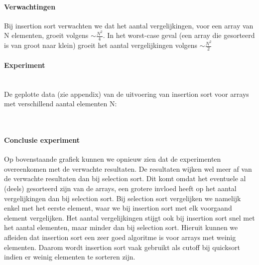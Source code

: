 \documentclass[11pt, a4paper]{article}
\begin{document}
\paragraph{Verwachtingen} Bij insertion sort verwachten we dat het aantal vergelijkingen, voor een array van N elementen, groeit volgens $\sim \frac{N^2}{4}$. In het worst-case geval (een array die gesorteerd is van groot naar klein) groeit het aantal vergelijkingen volgens $\sim \frac{N^2}{2}$ 
\paragraph{Experiment}\hspace{0pt}\\
De geplotte data (zie appendix) van de uitvoering van insertion sort voor arrays met verschillend aantal elementen N:\\
\\
\paragraph{Conclusie experiment} Op bovenstaande grafiek kunnen we opnieuw zien dat de experimenten overeenkomen met de verwachte resultaten. De resultaten wijken wel meer af van de verwachte resultaten dan bij selection sort. Dit komt omdat het eventuele al (deels) gesorteerd zijn van de arrays, een grotere invloed heeft op het aantal vergelijkingen dan bij selection sort. Bij selection sort vergelijken we namelijk enkel met het eerste element, waar we bij insertion sort met elk voorgaand element vergelijken.
\indent Het aantal vergelijkingen stijgt ook bij insertion sort snel met het aantal elementen, maar minder dan bij selection sort. Hieruit kunnen we afleiden dat insertion sort een zeer goed algoritme is voor arrays met weinig elementen. Daarom wordt insertion sort vaak gebruikt als cutoff bij quicksort indien er weinig elementen te sorteren zijn.
\end{document}
